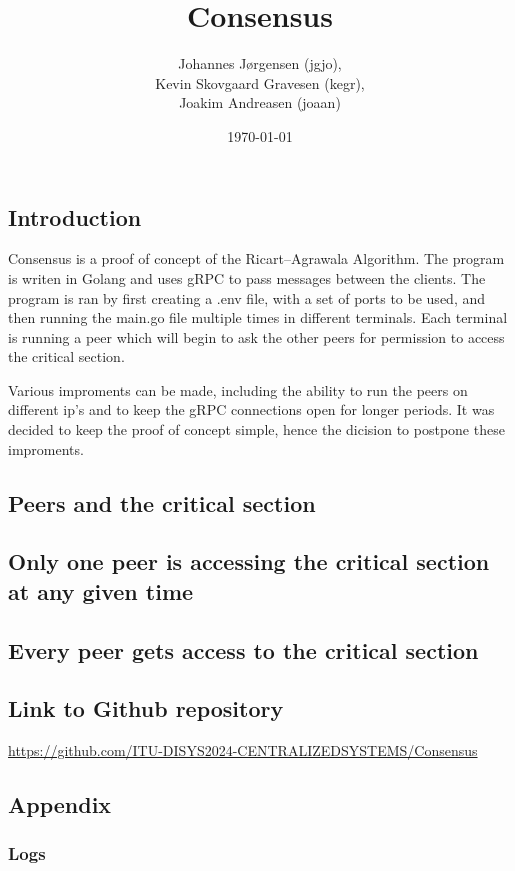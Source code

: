 \documentclass[a4paper,11pt]{article}
\title{Consensus}
\author{Johannes Jørgensen (jgjo),\\ Kevin Skovgaard Gravesen (kegr),\\ Joakim Andreasen (joaan)}
\date{\today}
\begin{document}
 

\maketitle

\subsection*{Introduction}
Consensus is a proof of concept of the Ricart–Agrawala Algorithm. The program is writen in Golang and uses gRPC to pass messages between the clients.
The program is ran by first creating a .env file, with a set of ports to be used, and then running the main.go file multiple times in different terminals.
Each terminal is running a peer which will begin to ask the other peers for permission to access the critical section.

Various improments can be made, including the ability to run the peers on different ip's and to keep the gRPC connections open for longer periods.
It was decided to keep the proof of concept simple, hence the dicision to postpone these improments.

\subsection*{Peers and the critical section}


\subsection*{Only one peer is accessing the critical section at any given time}


\subsection*{Every peer gets access to the critical section}



\newpage
\subsection*{Link to Github repository}

\href{https://github.com/ITU-DISYS2024-CENTRALIZEDSYSTEMS/Consensus}{https://github.com/ITU-DISYS2024-CENTRALIZEDSYSTEMS/Consensus}

\subsection*{Appendix}

\subsubsection*{Logs}
\begin{lstlisting}[basicstyle=\ttfamily\footnotesize]

\end{lstlisting}
\end{document}
